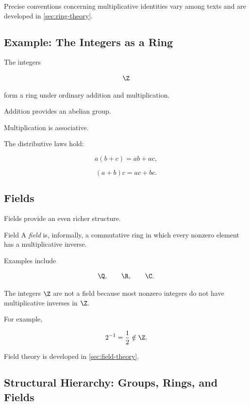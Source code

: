 Precise conventions concerning multiplicative identities vary among texts and
are developed in \cref{sec:ring-theory}.

\subsection{Example: The Integers as a Ring}
\label{subsec:integers-ring}

The integers

\[ \Z \]

form a ring under ordinary addition and multiplication.

Addition provides an abelian group.

Multiplication is associative.

The distributive laws hold:

\[ a(b+c)=ab+ac, \]

\[ (a+b)c=ac+bc. \]

\subsection{Fields}
\label{subsec:fields-overview}

Fields provide an even richer structure.

\begin{definitionbox}{Field}
A \emph{field} is, informally, a commutative ring in which every nonzero
element has a multiplicative inverse.
\end{definitionbox}

Examples include

\[ \Q,\qquad \R,\qquad \C. \]

The integers \(\Z\) are not a field because most nonzero integers do not have
multiplicative inverses in \(\Z\).

For example,

\[ 2^{-1}=\frac12\notin\Z. \]

Field theory is developed in \cref{sec:field-theory}.

\subsection{Structural Hierarchy: Groups, Rings, and Fields}
\label{subsec:group-ring-field-hierarchy}

